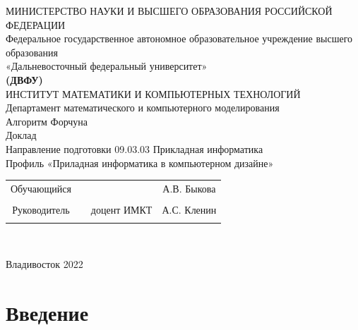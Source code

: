 \begin{center}
\hfill \break
\large{МИНИСТЕРСТВО НАУКИ И ВЫСШЕГО ОБРАЗОВАНИЯ РОССИЙСКОЙ ФЕДЕРАЦИИ}\\
\footnotesize{Федеральное государственное автономное образовательное учреждение высшего образования}\\ 
\footnotesize{«Дальневосточный федеральный университет»}\\
\small{\textbf{(ДВФУ)}}\\
\hfill \break
\normalsize{ИНСТИТУТ МАТЕМАТИКИ И КОМПЬЮТЕРНЫХ ТЕХНОЛОГИЙ}\\
 \hfill \break
\normalsize{Департамент математического и компьютерного моделирования}\\
\hfill\break
\hfill \break
\hfill \break
\hfill \break
\large{Алгоритм Форчуна}\\
\hfill \break
\hfill \break
\hfill \break
\normalsize{Доклад\\
\hfill \break
Направление подготовки 09.03.03 Прикладная информатика\\
\hfill \break
Профиль «Приладная информатика в компьютерном дизайне»}\\
\hfill \break
\hfill \break
\end{center}
 
\normalsize{} \hfill \break
\hfill \break
 
\normalsize{ 
\begin{tabular}{cccc}
Обучающийся & \underline{\hspace{3cm}} & &А.В. Быкова \\\\
Руководитель & \underline{\hspace{3cm}}& доцент ИМКТ &А.С. Кленин \\\\
\end{tabular}
}\\
\hfill \break
\hfill \break
\begin{center} Владивосток 2022 \end{center}
\thispagestyle{empty} 
 
\newpage
     
    \tableofcontents 
\newpage


\section{Введение}

